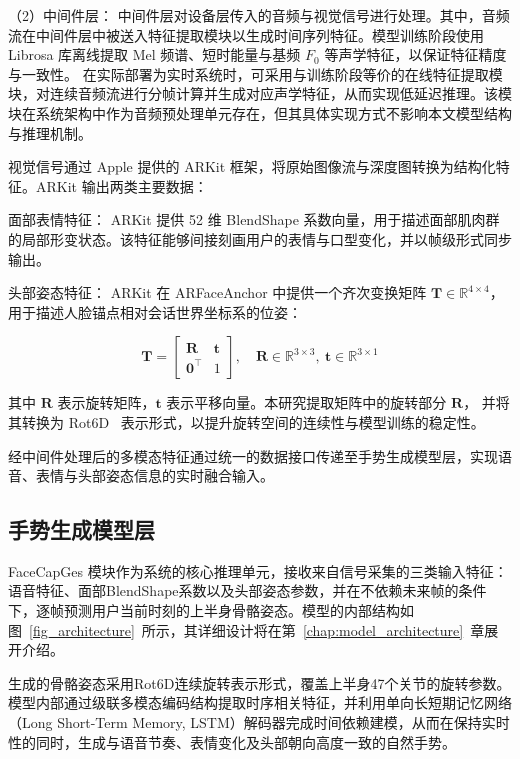 （2）中间件层：
中间件层对设备层传入的音频与视觉信号进行处理。其中，音频流在中间件层中被送入特征提取模块以生成时间序列特征。模型训练阶段使用 Librosa 库\cite{librosa}离线提取 Mel 频谱、短时能量与基频 $F_0$ 等声学特征，以保证特征精度与一致性。
在实际部署为实时系统时，可采用与训练阶段等价的在线特征提取模块，对连续音频流进行分帧计算并生成对应声学特征，从而实现低延迟推理。该模块在系统架构中作为音频预处理单元存在，但其具体实现方式不影响本文模型结构与推理机制。

视觉信号通过 Apple 提供的 ARKit 框架\cite{ARKitDocumentation}，将原始图像流与深度图转换为结构化特征。ARKit 输出两类主要数据：

面部表情特征：
ARKit 提供 52 维 BlendShape 系数向量，用于描述面部肌肉群的局部形变状态。该特征能够间接刻画用户的表情与口型变化，并以帧级形式同步输出。

头部姿态特征：
ARKit 在 ARFaceAnchor 中提供一个齐次变换矩阵 $\mathbf{T}\in\mathbb{R}^{4\times4}$，
用于描述人脸锚点相对会话世界坐标系的位姿：

\begin{equation}
\mathbf{T} =
\begin{bmatrix}
\mathbf{R} & \mathbf{t} \\
\mathbf{0}^{\top} & 1
\end{bmatrix},
\quad
\mathbf{R}\in\mathbb{R}^{3\times3},\ 
\mathbf{t}\in\mathbb{R}^{3\times1}
\end{equation}

其中 $\mathbf{R}$ 表示旋转矩阵，$\mathbf{t}$ 表示平移向量。本研究提取矩阵中的旋转部分 $\mathbf{R}$，
并将其转换为 Rot6D~\cite{rot6d} 表示形式，以提升旋转空间的连续性与模型训练的稳定性。

经中间件处理后的多模态特征通过统一的数据接口传递至手势生成模型层，实现语音、表情与头部姿态信息的实时融合输入。

\subsection{手势生成模型层}

FaceCapGes 模块作为系统的核心推理单元，接收来自信号采集的三类输入特征：语音特征、面部BlendShape系数以及头部姿态参数，并在不依赖未来帧的条件下，逐帧预测用户当前时刻的上半身骨骼姿态。模型的内部结构如图~\ref{fig_architecture}~所示，其详细设计将在第~\ref{chap:model_architecture}~章展开介绍。

生成的骨骼姿态采用Rot6D\cite{rot6d}连续旋转表示形式，覆盖上半身47个关节的旋转参数。模型内部通过级联多模态编码结构提取时序相关特征，并利用单向长短期记忆网络（Long Short-Term Memory, LSTM）\cite{lstm}解码器完成时间依赖建模，从而在保持实时性的同时，生成与语音节奏、表情变化及头部朝向高度一致的自然手势。

